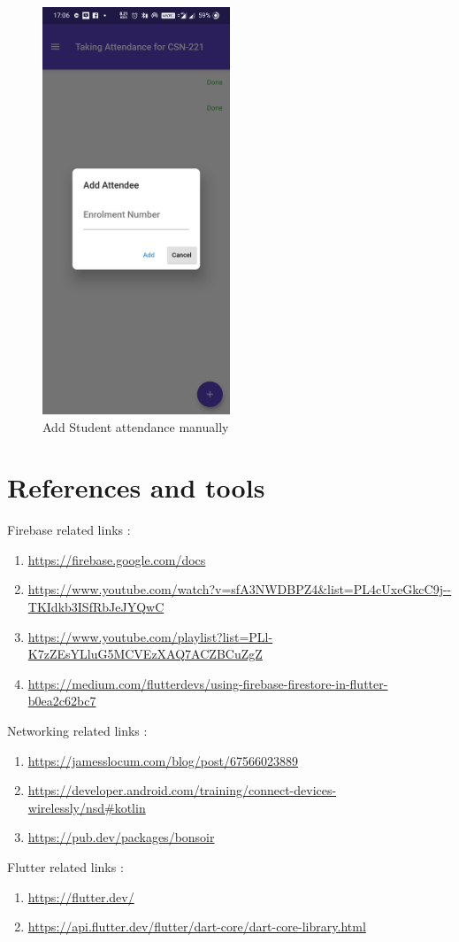 \documentclass{article}
\begin{document}
\begin{figure}[H]
    \centering
    \includegraphics[width=0.50\textwidth]{AddAttendee.jpg}
    \caption{Add Student attendance manually}
    \label{fig:AddStudent}
\end{figure}
\section{References and tools}
Firebase related links :
\begin{enumerate}
    \item \url{https://firebase.google.com/docs}
    \item \url{https://www.youtube.com/watch?v=sfA3NWDBPZ4&list=PL4cUxeGkcC9j--TKIdkb3ISfRbJeJYQwC}
    \item \url{https://www.youtube.com/playlist?list=PLl-K7zZEsYLluG5MCVEzXAQ7ACZBCuZgZ}
    \item \url{https://medium.com/flutterdevs/using-firebase-firestore-in-flutter-b0ea2c62bc7}
\end{enumerate}
Networking related links :
\begin{enumerate}
    \item \url{https://jamesslocum.com/blog/post/67566023889}
    \item \url{https://developer.android.com/training/connect-devices-wirelessly/nsd#kotlin}
    \item \url{https://pub.dev/packages/bonsoir}
\end{enumerate}
Flutter related links :
\begin{enumerate}
    \item \url{https://flutter.dev/}
    \item \url{https://api.flutter.dev/flutter/dart-core/dart-core-library.html}
\end{enumerate}
    
\end{document}
